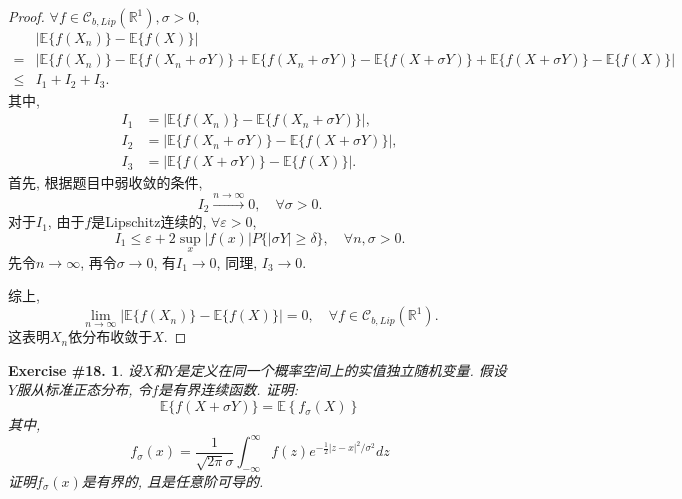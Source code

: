 \documentclass[UTF8, a4paper]{article}
\newtheorem{exercise}{Exercise \#18.}
\begin{document}
\begin{proof}
\(\forall f\in \mathscr{C}_{b,Lip}(\mathbb{R}^1), \sigma > 0\), 
$$
\begin{aligned}
    &\left|\mathbb{E}\{f(X_n)\} - \mathbb{E}\{f(X)\}\right| \\ = &\left|\mathbb{E}\{f(X_n)\} - \mathbb{E}\{f(X_n + \sigma Y)\} + \mathbb{E}\{f(X_n + \sigma Y)\} - \mathbb{E}\{f(X + \sigma Y)\} + \mathbb{E}\{f(X + \sigma Y)\} - \mathbb{E}\{f(X)\}\right| \\
    \leq & I_1 + I_2 + I_3.
\end{aligned}
$$
其中,
$$
\begin{aligned}
    I_1 &= \left|\mathbb{E}\{f(X_n)\} - \mathbb{E}\{f(X_n + \sigma Y)\}\right|, \\
    I_2 &= \left|\mathbb{E}\{f(X_n + \sigma Y)\} - \mathbb{E}\{f(X + \sigma Y)\}\right|, \\
    I_3 &= \left|\mathbb{E}\{f(X + \sigma Y)\} - \mathbb{E}\{f(X)\}\right|.
\end{aligned}
$$
首先, 根据题目中弱收敛的条件, 
$$
I_2 \xrightarrow{n\to\infty} 0, \quad \forall \sigma > 0.
$$
对于\(I_1\), 由于\(f\)是Lipschitz连续的, \(\forall \varepsilon > 0\),
$$
I_1 \leq \varepsilon + 2\sup_x |f(x)| P\{|\sigma Y| \geq \delta\}, \quad \forall n, \sigma > 0.
$$
先令\(n\to\infty\), 再令\(\sigma \to 0\), 有\(I_1 \to 0 \), 同理, \(I_3 \to 0\).

综上, 
$$
\lim_{n\to\infty} \left|\mathbb{E}\{f(X_n)\} - \mathbb{E}\{f(X)\}\right| = 0, \quad \forall f\in \mathscr{C}_{b,Lip}(\mathbb{R}^1).
$$
这表明\(X_n\)依分布收敛于\(X\).
\end{proof}


\begin{framed}
\begin{exercise}
设\(X\)和\(Y\)是定义在同一个概率空间上的实值独立随机变量. 
假设\(Y\)服从标准正态分布, 令\(f\)是有界连续函数. 证明:
$$
\mathbb{E}\{f(X+\sigma Y)\}=\mathbb{E}\left\{f_\sigma(X)\right\}
$$
其中, 
$$
f_\sigma(x)=\frac{1}{\sqrt{2 \pi} \sigma} \int_{-\infty}^{\infty} f(z) e^{-\frac{1}{2}|z-x|^2 / \sigma^2} d z
$$
证明\(f_\sigma(x)\)是有界的, 且是任意阶可导的.
\end{exercise}
\end{framed}
\end{document}

